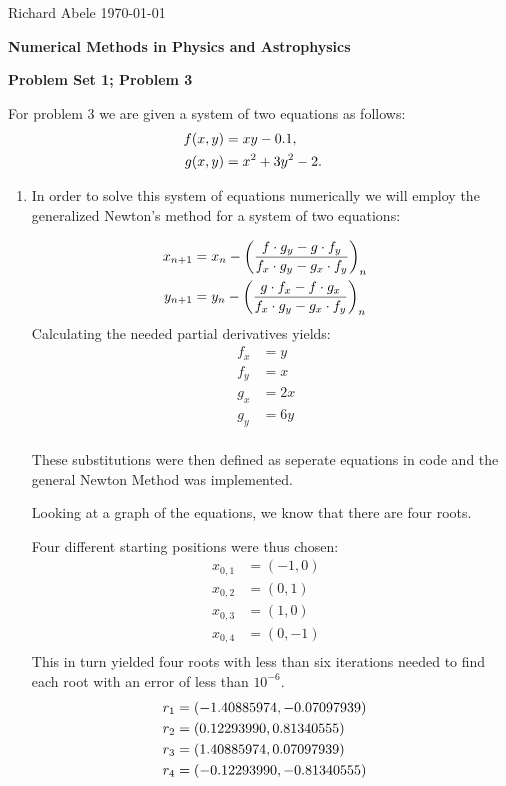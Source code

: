 \documentclass[12pt]{article}
\DeclarePairedDelimiter\rb{(}{)}
\begin{document}
\noindent Richard Abele \hfill \today \\[30pt]
\centerline{ \Large{ \textbf{ Numerical Methods in Physics and Astrophysics }}}
\centerline{ \Large{ \textbf{ Problem Set 1; Problem 3 }}}

For problem 3 we are given a system of two equations as follows: 
\begin{align*}
	f \rb*{x,y} & =  x y  - 0.1 ,&\\
	g \rb*{ x, y } & = x^{2}+ 3 y^{2} - 2 .&\\
\end{align*}

\begin{enumerate}
	\item 
In order to solve this system of equations numerically we will employ the generalized Newton's method for a system of two equations: 

\begin{align*}
	x_{n+1} & =  x_{n} - \rb*{ \frac{f \cdot g_{y} - g \cdot f_{y}}{
			f_{x} \cdot g_{y} - g_{x} \cdot f_{y}
	}}_{n} &\\
	y_{n+1} & =  y_{n} - 
	\rb*{\frac{g \cdot f_{x} - f \cdot g_{x}}{
			f_{x} \cdot g_{y} - g_{x} \cdot f_{y}
	}}_{n} &\\
\end{align*}
Calculating the needed partial derivatives yields: 
\begin{align*}
	f_{x} & =  y &\\
	f_{y} & =  x &\\
	g_{x} & =  2 x &\\
	g_{y} & =  6 y &\\
\end{align*}

These substitutions were then defined as seperate equations in code and the general Newton Method was implemented. 

Looking at a graph of the equations, we know that there are four roots. 

Four different starting positions were thus chosen:
\begin{align*}
	x_{0,1} & =  (-1,0) &\\
	x_{0,2} & =  (0 , 1) &\\
	x_{0,3} & =  (1, 0) &\\
	x_{0,4} & =  (0 , -1) &\\
\end{align*}
This in turn yielded four roots with less than six iterations needed to find each root with an error of less than \(10^{-6}\). 
\begin{align*}
	r_{1} & =  \rb*{-1.40885974, -0.07097939} &\\
	r_{2} & =  \rb*{0.12293990, 0.81340555} &\\
	r_{3} & =  \rb*{1.40885974, 0.07097939} &\\
	r_{4} & =  \rb*{-0.12293990, -0.81340555} &\\
\end{align*}


\end{enumerate}
\end{document}
